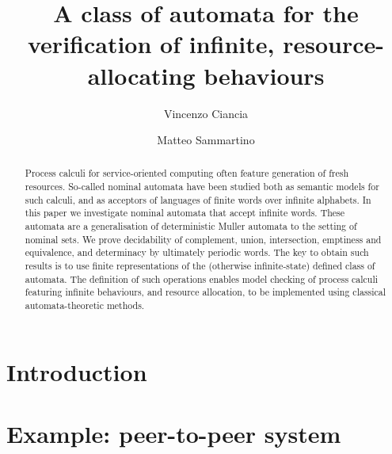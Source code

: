 \documentclass[orivec]{llncs}
\title{A class of automata for the verification of infinite, resource-allocating behaviours
}
\author{Vincenzo Ciancia\inst{1} \and Matteo Sammartino\inst{2}}
\institute{ISTI-CNR, Pisa \and Dipartimento di Informatica, Universit\`a di Pisa, Pisa }
\begin{document}
\maketitle

\begin{abstract}
Process calculi for service-oriented computing often feature generation of fresh resources. So-called nominal automata have been studied both as semantic models for such calculi, and as acceptors of languages of finite words over infinite alphabets. In this paper we investigate nominal automata that accept infinite words. These automata are a generalisation of deterministic Muller automata to the setting of nominal sets. We prove decidability of complement, union, intersection, emptiness and equivalence, and determinacy by ultimately periodic words. The key to obtain such results is to use finite representations of the (otherwise infinite-state) defined class of automata. The definition of such operations enables model checking of process calculi featuring infinite behaviours, and resource allocation, to be implemented using classical automata-theoretic methods.
% 
\end{abstract}

\section{Introduction}\label{sec:introduction}

\section{Example: peer-to-peer system}\label{sec:example}

\end{document}
